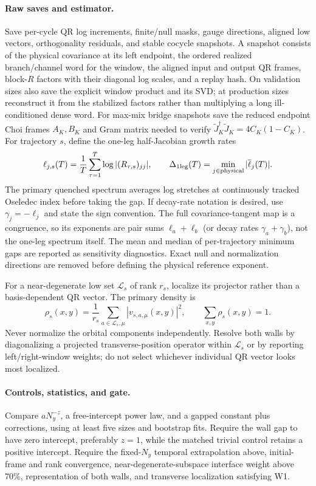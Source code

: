 \documentclass[aps,prx,onecolumn,nofootinbib,superscriptaddress,longbibliography]{revtex4-2}
\begin{document}
\paragraph{Raw saves and estimator.}
Save per-cycle QR log increments, finite/null masks, gauge directions, aligned low vectors,
orthogonality residuals, and stable cocycle snapshots.  A snapshot consists of the physical
covariance at its left endpoint, the ordered realized branch/channel word for the window,
the aligned input and output QR frames, block-$R$ factors with their diagonal log scales,
and a replay hash.  On validation sizes also save the explicit window product and its SVD;
at production sizes reconstruct it from the stabilized factors rather than multiplying a
long ill-conditioned dense word.  For max-mix bridge snapshots save the reduced endpoint
Choi frames $A_K,B_K$ and Gram matrix needed to verify
$\widetilde J_K^\dagger\widetilde J_K=4C_K(1-C_K)$.  For trajectory $s$, define the
one-leg half-Jacobian growth rates
\begin{equation}
 \ell_{j,s}(T)=\frac1T\sum_{\tau=1}^{T}\log |(R_{\tau,s})_{jj}|,
 \qquad
 \Delta_{\rm 1leg}(T)=\min_{j\in\mathrm{physical}}|\overline\ell_j(T)|.
 \label{eq:one-leg-growth-rates}
\end{equation}
The primary quenched spectrum averages log stretches at continuously tracked Oseledec
index before taking the gap.  If decay-rate notation is desired, use
$\gamma_j=-\ell_j$ and state the sign convention.  The full covariance-tangent map is a
congruence, so its exponents are pair sums $\ell_a+\ell_b$ (or decay rates
$\gamma_a+\gamma_b$), not the one-leg spectrum itself.  The mean and median of
per-trajectory minimum gaps are reported as sensitivity diagnostics.  Exact null and
normalization directions are removed before defining the physical reference exponent.

For a near-degenerate low set $\mathcal L_s$ of rank $r_s$, localize its projector rather
than a basis-dependent QR vector.  The primary density is
\begin{equation}
 \rho_s(x,y)=\frac1{r_s}\sum_{a\in\mathcal L_s,\mu}
 |v_{s,a,\mu}(x,y)|^2,
 \qquad \sum_{x,y}\rho_s(x,y)=1.
\end{equation}
Never normalize the orbital components independently.  Resolve both walls by diagonalizing
a projected transverse-position operator within $\mathcal L_s$ or by reporting
left/right-window weights; do not select whichever individual QR vector looks most
localized.

\paragraph{Controls, statistics, and gate.}
Compare $aN_y^{-z}$, a free-intercept power law, and a gapped constant plus corrections,
using at least five sizes and bootstrap fits.  Require the wall gap to have zero intercept,
preferably $z=1$, while the matched trivial control retains a positive intercept.  Require
the fixed-$N_y$ temporal extrapolation above, initial-frame and rank convergence,
near-degenerate-subspace interface weight above 70\%, representation of both walls, and
transverse localization satisfying W1.
\end{document}
